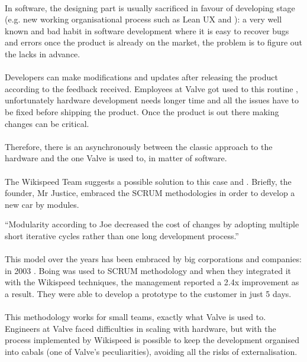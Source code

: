 \documentclass[12pt,twoside,notitle,a4paper]{article}
\begin{document}
\paragraph{}In software, the designing part is usually sacrificed in favour of developing stage (e.g. new working organisational process such as Lean UX \citep*{liikkanen2014lean} and \citep*{may2012applying}): 
a very well known and bad habit in software development where it is easy to recover bugs and errors once the product is already on the market, the problem is to figure out the lacks in advance.
\paragraph{}Developers can make modifications and updates after releasing the product according to the feedback received. Employees at Valve got used to this routine \citep*{valveScrum}, unfortunately hardware development needs longer time and all the issues have to be fixed before shipping the product. Once the product is out there making changes can be critical.
\paragraph{}Therefore, there is an asynchronously between the classic approach to the hardware and the one Valve is used to, in matter of software.
\paragraph{}The Wikispeed Team suggests a possible solution to this case \citep*{Wikispeed} and \citep*{denning2012agile}. Briefly, the founder, Mr Justice, embraced the SCRUM methodologies in order to develop a new car by modules.


“Modularity according to Joe decreased the cost of changes by adopting multiple short iterative cycles rather than one long development process.”

\paragraph{}This model over the years has been embraced by big corporations and companies: in 2003 \citep*{Wikispeed}. Boing was used to SCRUM methodology and when they integrated it with the Wikispeed techniques, the management reported a 2.4x improvement as a result. They were able to develop a prototype to the customer in just 5 days.
\paragraph{}This methodology works for small teams, exactly what Valve is used to. 
Engineers at Valve faced difficulties in scaling with hardware, but with the process implemented by Wikispeed  is possible to keep the development organised into cabals (one of Valve’s peculiarities), avoiding all the risks of externalisation.
\end{document}
